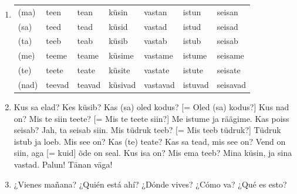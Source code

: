 \begin{enumerate}
\item
\begin{tabular}{ l l l l l l l }
(ma)	& teen		& tean		& küsin		& vastan	& istun		& seisan \\
(sa)	& teed		& tead		& küsid		& vastad	& istud		& seisad \\
(ta)	& teeb		& teab		& küsib		& vastab	& istub		& seisab \\
(me)	& teeme		& teame		& küsime	& vastame	& istume	& seisame \\
(te)	& teete		& teate		& küsite	& vastate	& istute	& seisate \\
(nad)	& teevad	& teavad	& küsivad	& vastavad	& istuvad	& seisavad
\end{tabular}
\item Kus sa elad? Kes küsib? Kas (sa) oled kodus? [= Oled (sa) kodus?] Kus nad on? Mis te siin teete? [= Mis te teete siin?] Me istume ja räägime. Kas poiss seisab? Jah, ta seisab siin. Mis tüdruk teeb? [= Mis teeb tüdruk?] Tüdruk istub ja loeb. Mis see on? Kas (te) teate? Kas sa tead, mis see on? Vend on siin, aga [= kuid] õde on seal. Kus isa on? Mis ema teeb? Mina küsin, ja sina vastad. Palun! Tänan väga!
\item ¿Vienes mañana? ¿Quién está ahí? ¿Dónde vives? ¿Cómo va? ¿Qué es esto?
\end{enumerate}
